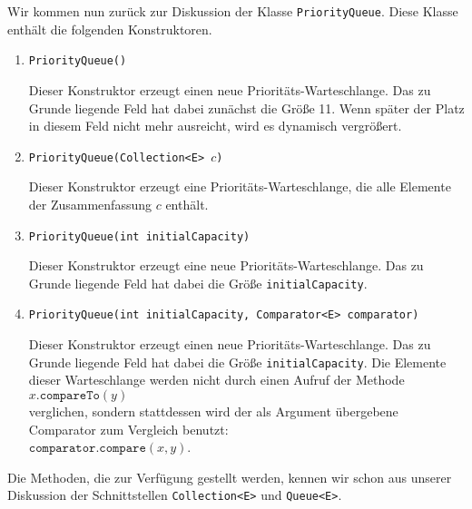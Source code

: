 Wir kommen nun zur\"uck zur Diskussion der Klasse \texttt{PriorityQueue}.
Diese Klasse enth\"alt die folgenden Konstruktoren.
\begin{enumerate}
\item \texttt{PriorityQueue()}

      Dieser Konstruktor erzeugt einen neue Priorit\"ats-Warteschlange.
      Das zu Grunde liegende Feld hat dabei zun\"achst die Gr\"o{\ss}e 11.
      Wenn sp\"ater der Platz in diesem Feld nicht mehr ausreicht, wird es dynamisch
      vergr\"o{\ss}ert. 
\item \texttt{PriorityQueue(Collection<E> $c$)}
  
      Dieser Konstruktor erzeugt eine Priorit\"ats-Warteschlange, die alle Elemente der
      Zusammenfassung $c$ enth\"alt.
\item \texttt{PriorityQueue(int initialCapacity)}
  
      Dieser Konstruktor  erzeugt eine neue Priorit\"ats-Warteschlange.
      Das zu Grunde liegende Feld hat dabei die Gr\"o{\ss}e \texttt{initialCapacity}.
\item \texttt{PriorityQueue(int initialCapacity, Comparator<E> comparator)}

      Dieser Konstruktor  erzeugt einen neue Priorit\"ats-Warteschlange.
      Das zu Grunde liegende Feld hat dabei die Gr\"o{\ss}e \texttt{initialCapacity}.
      Die Elemente dieser Warteschlange werden nicht durch einen Aufruf der
      Methode 
      \\[0.2cm]
      \hspace*{1.3cm}
      $x.\texttt{compareTo}(y)$ 
      \\[0.2cm]
      verglichen, sondern stattdessen wird der als Argument \"ubergebene Comparator
      zum Vergleich benutzt:
      \\[0.2cm]
      \hspace*{1.3cm}
      $\mathtt{comparator}.\texttt{compare}(x,y)$. 
\end{enumerate}
Die Methoden, die zur Verf\"ugung gestellt werden, kennen wir schon aus unserer Diskussion
der Schnittstellen \texttt{Collection<E>} und \texttt{Queue<E>}. 

